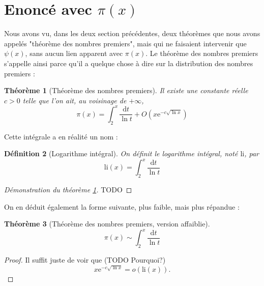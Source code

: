 \documentclass[french]{report}
\newtheorem{theorem}{Théorème}[section]
\newtheorem{definition}[theorem]{Définition}
\begin{document}
\section{Enoncé avec $\pi(x)$}

Nous avons vu, dans les deux section précédentes, deux théorèmes que nous avons appelés "théorème des nombres premiers", mais qui ne faisaient intervenir que $\psi(x)$, sans aucun lien apparent avec $\pi(x)$. Le théorème des nombres premiers s'appelle ainsi parce qu'il a quelque chose à dire sur la distribution des nombres premiers :

\begin{theorem}[Théorème des nombres premiers]\label{eq:tnp-pi-x}
  Il existe une constante réelle $c>0$ telle que l'on ait, au voisinage de $+\infty$,
  \[ \pi(x) = \int_2^x\frac{\mathrm{d}t}{\ln t} + O(x\mathrm{e}^{-c\sqrt{\ln x}}) \]
\end{theorem}

Cette intégrale a en réalité un nom :

\begin{definition}[Logarithme intégral] On définit le logarithme intégral, noté $\mathrm{li}$, par
  \[ \mathrm{li}(x) = \int_2^x\frac{\mathrm{d}t}{\ln t} \]
\end{definition}

\begin{proof}[Démonstration du théorème \ref{eq:tnp-pi-x}]
  TODO
\end{proof}

On en déduit également la forme suivante, plus faible, mais plus répandue :

\begin{theorem}[Théorème des nombres premiers, version affaiblie]\label{eq:tnp-equivalence}
  \[ \pi(x)\sim\int_2^x\frac{\mathrm{d}t}{\ln t} \]
\end{theorem}

\begin{proof}
  Il suffit juste de voir que (TODO Pourquoi?)
  \[ x\mathrm{e}^{-c\sqrt{\ln x}} = o(\mathrm{li}(x)). \]
\end{proof}
\end{document}

